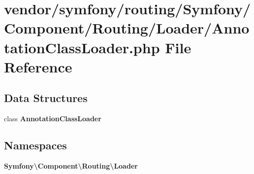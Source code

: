\section{vendor/symfony/routing/\+Symfony/\+Component/\+Routing/\+Loader/\+Annotation\+Class\+Loader.php File Reference}
\label{_annotation_class_loader_8php}
\subsection*{Data Structures}
\begin{DoxyCompactItemize}
\item 
class {\bf Annotation\+Class\+Loader}
\end{DoxyCompactItemize}
\subsection*{Namespaces}
\begin{DoxyCompactItemize}
\item 
 {\bf Symfony\textbackslash{}\+Component\textbackslash{}\+Routing\textbackslash{}\+Loader}
\end{DoxyCompactItemize}
